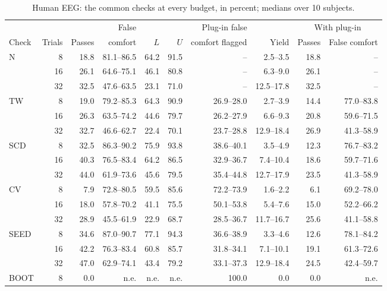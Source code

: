 \documentclass[11pt]{article}
\begin{document}
\begin{table}[!htb]
\centering\scriptsize
\caption{Human EEG: the common checks at every budget, in percent; medians over 10 subjects.}
\begin{tabular}{lrrrrrrrrr}
\toprule
 & & & False & & & Plug-in false & & \multicolumn{2}{c}{With plug-in} \\
\cmidrule(lr){9-10}
Check & Trials & Passes & comfort & $L$ & $U$ & comfort flagged & Yield & Passes & False comfort \\
\midrule
N & 8 & 18.8 & 81.1--86.5 & 64.2 & 91.5 & -- & 2.5--3.5 & 18.8 & -- \\
 & 16 & 26.1 & 64.6--75.1 & 46.1 & 80.8 & -- & 6.3--9.0 & 26.1 & -- \\
 & 32 & 32.5 & 47.6--63.5 & 23.1 & 71.0 & -- & 12.5--17.8 & 32.5 & -- \\
\addlinespace
TW & 8 & 19.0 & 79.2--85.3 & 64.3 & 90.9 & 26.9--28.0 & 2.7--3.9 & 14.4 & 77.0--83.8 \\
 & 16 & 26.3 & 63.5--74.2 & 44.6 & 79.7 & 26.2--27.9 & 6.6--9.3 & 20.8 & 59.6--71.5 \\
 & 32 & 32.7 & 46.6--62.7 & 22.4 & 70.1 & 23.7--28.8 & 12.9--18.4 & 26.9 & 41.3--58.9 \\
\addlinespace
SCD & 8 & 32.5 & 86.3--90.2 & 75.9 & 93.8 & 38.6--40.1 & 3.5--4.9 & 12.3 & 76.7--83.2 \\
 & 16 & 40.3 & 76.5--83.4 & 64.2 & 86.5 & 32.9--36.7 & 7.4--10.4 & 18.6 & 59.7--71.6 \\
 & 32 & 44.0 & 61.9--73.6 & 45.6 & 79.5 & 35.4--44.8 & 12.7--17.9 & 23.5 & 41.3--58.9 \\
\addlinespace
CV & 8 & 7.9 & 72.8--80.5 & 59.5 & 85.6 & 72.2--73.9 & 1.6--2.2 & 6.1 & 69.2--78.0 \\
 & 16 & 18.0 & 57.8--70.2 & 41.1 & 75.5 & 50.1--53.8 & 5.4--7.6 & 15.0 & 52.2--66.2 \\
 & 32 & 28.9 & 45.5--61.9 & 22.9 & 68.7 & 28.5--36.7 & 11.7--16.7 & 25.6 & 41.1--58.8 \\
\addlinespace
SEED & 8 & 34.6 & 87.0--90.7 & 77.1 & 94.3 & 36.6--38.9 & 3.3--4.6 & 12.6 & 78.1--84.2 \\
 & 16 & 42.2 & 76.3--83.4 & 60.8 & 85.7 & 31.8--34.1 & 7.1--10.1 & 19.1 & 61.3--72.6 \\
 & 32 & 47.0 & 62.9--74.1 & 43.4 & 79.2 & 33.1--37.3 & 12.9--18.4 & 24.5 & 42.4--59.7 \\
\addlinespace
BOOT & 8 & 0.0 & n.e. & n.e. & n.e. & 100.0 & 0.0 & 0.0 & n.e. \\

\end{tabular}
\end{table}
\end{document}
